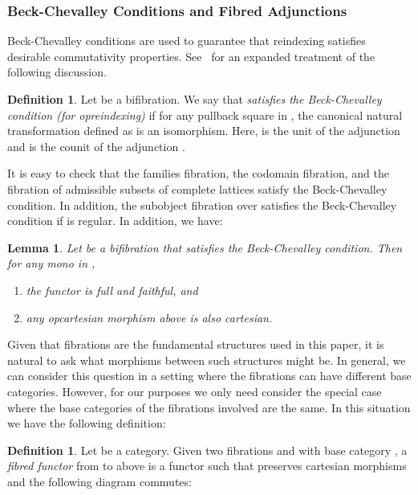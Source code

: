 \documentclass{LMCS}
\theoremstyle{plain}
\newtheorem{lemma}[theorem]{Lemma}
\theoremstyle{remark}
\theoremstyle{definition}
\newtheorem{definition}[theorem]{Definition}
\begin{document}
\subsubsection{Beck-Chevalley Conditions and Fibred Adjunctions}    

Beck-Chevalley conditions are used to guarantee that reindexing
satisfies desirable commutativity properties. See~\cite{jac99} for an
expanded treatment of the following discussion.

\begin{definition}\label{def:beckcc}
  Let  be a bifibration. We say that  \emph{satisfies
    the Beck-Chevalley condition (for opreindexing)} if for any
  pullback square
   in , the canonical natural transformation  defined as  is an
  isomorphism. Here,  is the unit of the adjunction
   and  is the counit of the
  adjunction .
\end{definition}
\noindent 
It is easy to check that the families fibration, the codomain
fibration, and the fibration of admissible subsets of complete
lattices satisfy the Beck-Chevalley condition. In addition, the
subobject fibration over  satisfies the Beck-Chevalley condition
if  is regular. In addition, we have:

\begin{lemma}\label{lem:bcmono}
  Let  be a bifibration that satisfies the Beck-Chevalley
  condition. Then for any mono  in ,
  \begin{enumerate}[\em(1)]
  \item the functor  is full and faithful, and
  \item any opcartesian morphism above  is also cartesian.
  \end{enumerate}
\end{lemma}

Given that fibrations are the fundamental structures used in this
paper, it is natural to ask what morphisms between such structures
might be. In general, we can consider this question in a setting where
the fibrations can have different base categories. However, for our
purposes we only need consider the special case where the base
categories of the fibrations involved are the same. In this situation
we have the following definition:

\begin{definition}
  Let  be a category. Given two fibrations  and
   with base category , a {\em fibred functor} from
   to  above  is a functor  such that 
  preserves cartesian morphisms and the following diagram commutes:
  
\end{definition}
\end{document}
